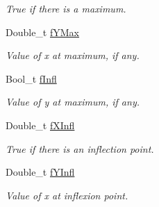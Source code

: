 \begin{DoxyCompactItemize}
\begin{DoxyCompactList}\small\item\em True if there is a maximum. \item\end{DoxyCompactList}\item 
\hypertarget{classTPoly3_a7b0e1305051521e24c6a19fe596e1503}{
Double\_\-t \hyperlink{classTPoly3_a7b0e1305051521e24c6a19fe596e1503}{fYMax}}
\label{classTPoly3_a7b0e1305051521e24c6a19fe596e1503}

\begin{DoxyCompactList}\small\item\em Value of x at maximum, if any. \item\end{DoxyCompactList}\item 
\hypertarget{classTPoly3_aae8153cdba426b8389b661107005fe3f}{
Bool\_\-t \hyperlink{classTPoly3_aae8153cdba426b8389b661107005fe3f}{fInfl}}
\label{classTPoly3_aae8153cdba426b8389b661107005fe3f}

\begin{DoxyCompactList}\small\item\em Value of y at maximum, if any. \item\end{DoxyCompactList}\item 
\hypertarget{classTPoly3_adfc4327bf88f87d341113de3c20d9823}{
Double\_\-t \hyperlink{classTPoly3_adfc4327bf88f87d341113de3c20d9823}{fXInfl}}
\label{classTPoly3_adfc4327bf88f87d341113de3c20d9823}

\begin{DoxyCompactList}\small\item\em True if there is an inflection point. \item\end{DoxyCompactList}\item 
\hypertarget{classTPoly3_a7796c7247db318900594e0922047171b}{
Double\_\-t \hyperlink{classTPoly3_a7796c7247db318900594e0922047171b}{fYInfl}}
\label{classTPoly3_a7796c7247db318900594e0922047171b}

\begin{DoxyCompactList}\small\item\em Value of x at inflexion point. \item\end{DoxyCompactList}\end{DoxyCompactItemize}
